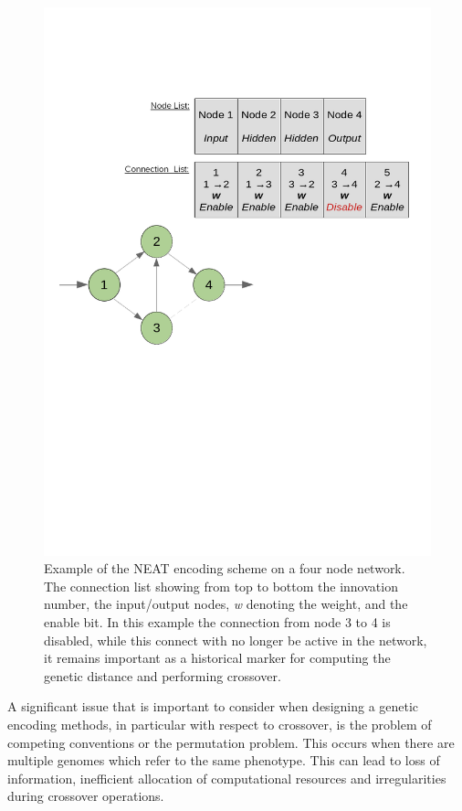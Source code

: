 			\begin{figure}[h]
			
				\centering 
				\includegraphics[trim= 250 380 250 110 ,scale=0.35]{NEAT.png}


				\caption{Example of the NEAT encoding scheme on a four node network. The connection list showing from top to bottom the innovation number, the input/output nodes, \textit{w} denoting the weight, and the enable bit. In this example the connection from node 3 to 4 is disabled, while this connect with no longer be active in the network, it remains important as a historical marker for computing the genetic distance and performing crossover. }
				\label{fig:GA3}


			\end{figure}

		A significant issue that is important to consider when designing a genetic encoding methods, in particular with respect to crossover, is the problem of competing conventions or the permutation problem\cite{38}\cite{24}. This occurs when there are multiple genomes which refer to the same phenotype. This can lead to loss of information, inefficient allocation of computational resources and irregularities during crossover operations. 

